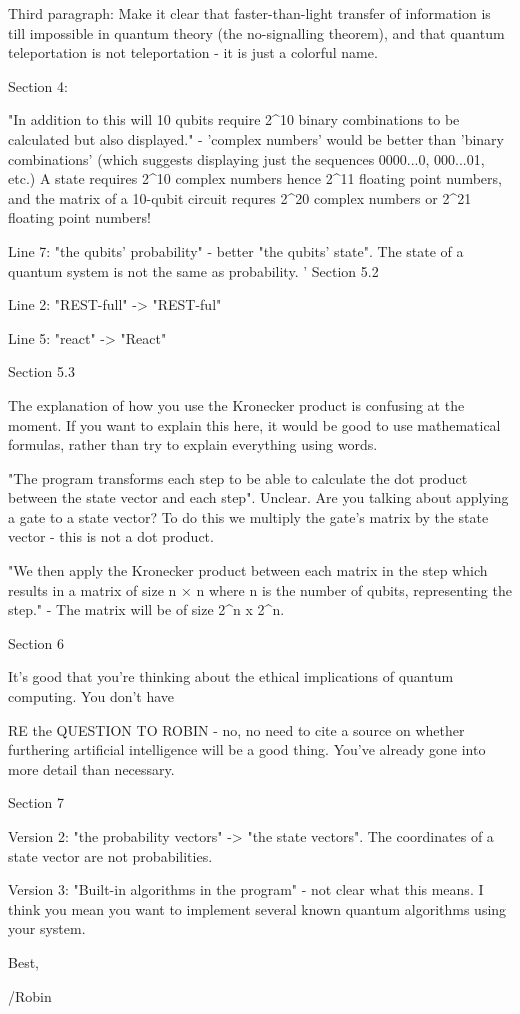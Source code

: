 Third paragraph: Make it clear that faster-than-light transfer of information is till impossible in quantum theory (the no-signalling theorem), and that quantum teleportation is not teleportation - it is just a colorful name.

Section 4:

"In addition to this will 10 qubits require 2^10 binary combinations to be calculated but also displayed." - 'complex numbers' would be better than 'binary combinations' (which suggests displaying just the sequences 0000...0, 000...01, etc.) A state requires 2^10 complex numbers hence 2^11 floating point numbers, and the matrix of a 10-qubit circuit requres 2^20 complex numbers or 2^21 floating point numbers!

Line 7: "the qubits’ probability" - better "the qubits' state". The state of a quantum system is not the same as probability.
'
Section 5.2

Line 2: "REST-full" -> "REST-ful"

Line 5: "react" -> "React"

Section 5.3

The explanation of how you use the Kronecker product is confusing at the moment. If you want to explain this here, it would be good to use mathematical formulas, rather than try to explain everything using words.

"The program transforms each step to be able to calculate the dot product between the state vector and each step". Unclear. Are you talking about applying a gate to a state vector? To do this we multiply the gate's matrix by the state vector - this is not a dot product.

"We then apply the Kronecker product between each matrix in the step which results in a matrix of size n × n where n is the number of qubits, representing the step." - The matrix will be of size 2^n x 2^n.

Section 6

It's good that you're thinking about the ethical implications of quantum computing. You don't have 

RE the QUESTION TO ROBIN - no, no need to cite a source on whether furthering artificial intelligence will be a good thing. You've already gone into more detail than necessary.

Section 7

Version 2: "the probability vectors" -> "the state vectors". The coordinates of a state vector are not probabilities.

Version 3: "Built-in algorithms in the program" - not clear what this means. I think you mean you want to implement several known quantum algorithms using your system.

Best,

/Robin